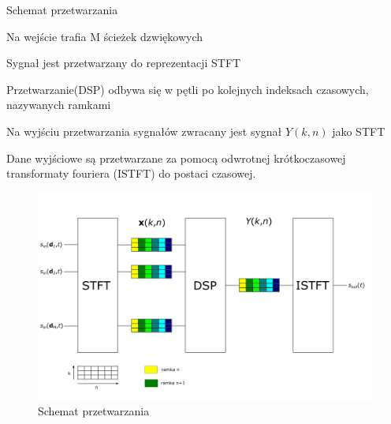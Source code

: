 \begin{algorithm}
  
  \caption{Schemat przetwarzania}
  \begin{algorithmic}[1]
    \State Na wejście trafia M ścieżek dzwiękowych
    
    \State Sygnał jest przetwarzany do reprezentacji STFT
    
    \State Przetwarzanie(DSP) odbywa się w pętli po kolejnych indeksach czasowych, nazywanych ramkami
    
    \State Na wyjściu przetwarzania sygnałów zwracany jest sygnał $Y(k,n)$ jako STFT
    
    \State Dane wyjściowe są przetwarzane za pomocą odwrotnej krótkoczasowej transformaty fouriera (ISTFT) do postaci czasowej.
    
  \end{algorithmic}
\end{algorithm}

\begin{figure}[h!]
    \centering
    \includegraphics[width=\textwidth]{Images/processing.png}
    \caption{Schemat przetwarzania}
    \label{fig:processing}
\end{figure}

